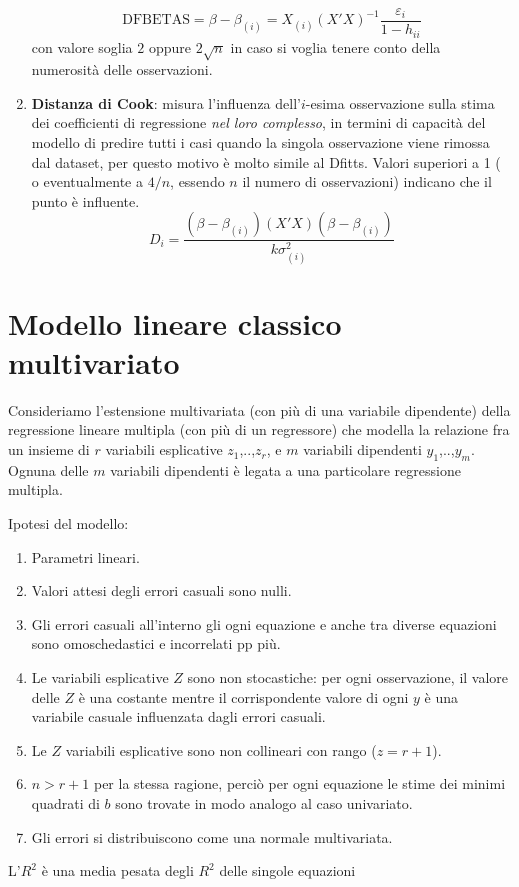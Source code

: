 \documentclass[a4page, 11pt]{article} %
\begin{document}
\begin{enumerate}
\begin{equation*}
\mathrm{DFBETAS} = \beta - \beta_{(i)} = X_{(i)}(X'X)^{-1}\frac{\varepsilon_i}{1-h_{ii}}
\end{equation*}
con valore soglia $2$ oppure $2\sqrt{n}$ in caso si voglia tenere conto della numerosità delle osservazioni.
\item \textbf{Distanza di Cook}: misura l’influenza dell'$i$-esima osservazione sulla stima dei coefficienti di regressione \textit{nel loro complesso}, in termini di capacità del modello di predire tutti i casi quando la singola osservazione viene rimossa dal dataset, per questo motivo è molto simile al Dfitts. Valori superiori a 1 ( o eventualmente a $4/n$, essendo $n$ il numero di osservazioni) indicano che il punto è influente.
\begin{equation*}
D_i = \frac{(\beta - \beta_{(i)})(X'X)(\beta - \beta_{(i)})}{k\sigma_{(i)}^2}
\end{equation*}
\end{enumerate}

\section{Modello lineare classico multivariato}

Consideriamo l’estensione multivariata (con più di una variabile dipendente) della regressione lineare multipla (con più di un regressore) che modella la relazione fra un insieme di $r$ variabili esplicative $z_1$,..,$z_r$, e $m$ variabili dipendenti $y_1$,..,$y_m$. Ognuna delle $m$ variabili dipendenti è legata a una particolare regressione multipla. 

Ipotesi del modello:
\begin{enumerate}[noitemsep]
\item Parametri lineari.
\item Valori attesi degli errori casuali sono nulli.
\item Gli errori casuali all’interno gli ogni equazione e anche tra diverse equazioni sono omoschedastici e incorrelati pp più.
\item Le  variabili esplicative $Z$ sono non stocastiche: per ogni osservazione, il valore delle $Z$ è una costante mentre il corrispondente valore di ogni $y$ è una variabile casuale influenzata dagli errori casuali.
\item Le $Z$ variabili esplicative sono non collineari con rango ($z=r+1$).
\item $n > r+1$ per la stessa ragione, perciò per ogni equazione le stime dei minimi quadrati di $b$ sono trovate in modo analogo al caso univariato. %
\item Gli errori si distribuiscono come una normale multivariata.
\end{enumerate}
L’$R^{2}$ è una media pesata degli $R^{2}$ delle singole equazioni
\end{document}
